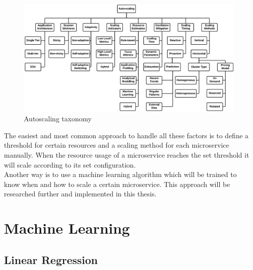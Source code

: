 \documentclass[
	ngerman,
	ruledheaders=section,%
	class=report,%
	thesis={type=master},%
	accentcolor=8c,%
	custommargins=false,%
	marginpar=false,%
	parskip=half-,%
	fontsize=11pt,%
]{tudapub}
\begin{document}
\begin{figure}[h]
    \centering
    \includegraphics[width=\textwidth]{data/basics/autoscaling.png}
    \caption{Autoscaling taxonomy \cite{qu2018auto}}
    \label{fig:autoscaling}
\end{figure}

The easiest and most common approach to handle all these factors is to define a threshold for certain resources and a scaling method for each microservice manually. When the resource usage of a microservice reaches the set threshold it will scale according to its set configuration.\\
Another way is to use a machine learning algorithm which will be trained to know when and how to scale a certain microservice. This approach will be researched further and implemented in this thesis.
\section{Machine Learning}
\subsection{Linear Regression}
\end{document}
